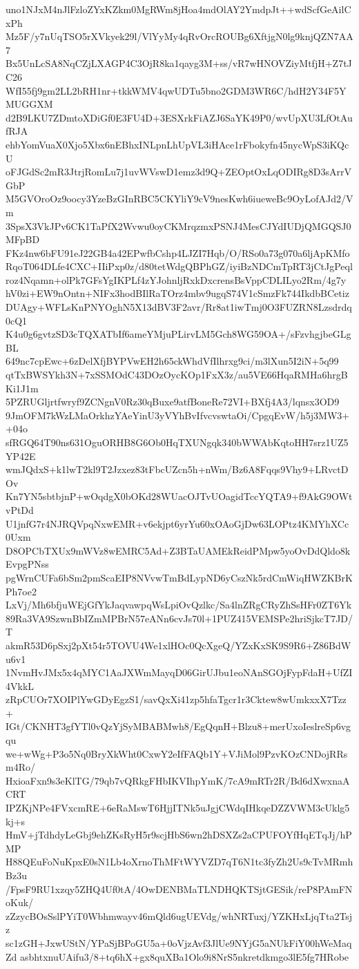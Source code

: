 uno1NJxM4nJlFzloZYxKZkm0MgRWm8jHoa4mdOlAY2YmdpJt++wdScfGeAilCxPh
Mz5F/y7nUqTSO5rXVkyek29l/VlYyMy4qRvOrcROUBg6XftjgN0lg9knjQZN7AA7
Bx5UnLcSA8NqCZjLXAGP4C3OjR8ka1qayg3M+ss/vR7wHNOVZiyMtfjH+Z7tJC26
WfI55fj9gm2LL2bRH1nr+tkkWMV4qwUDTu5bno2GDM3WR6C/hdH2Y34F5YMUGGXM
d2B9LKU7ZDmtoXDiGf0E3FU4D+3ESXrkFiAZJ6SaYK49P0/wvUpXU3LfOtAufRJA
ehbYomVuaX0Xjo5Xbx6nEBhxINLpnLhUpVL3iHAce1rFbokyfn45nycWpS3iKQcU
oFJGdSc2mR3JtrjRomLu7j1uvWVswD1emz3d9Q+ZEOptOxLqODIRg8D3sArrVGbP
M5GVOroOz9oocy3YzeBzGInRBC5CKYliY9cV9nesKwh6iueweBc9OyLofAJd2/Vm
3SpsX3VkJPv6CK1TaPfX2Wvwu0oyCKMrqzmxPSNJ4MesCJYdIUDjQMGQSJ0MFpBD
FKz4nw6bFU91eJ22GB4a42EPwfbCshp4LJZI7Hqb/O/RSo0a73g070a6ljApKMfo
RqoT064DLfe4CXC+IIiPxp0z/d80tetWdgQBPhGZ/iyiBzNDCmTpRT3jCtJgPeql
roz4Nqamn+olPk7GFsYgIKPLf4zYJohnljRxkDxcrensBsVppCDLILyo2Rm/4g7y
hV0zi+EW9nOntn+NIFx3hodBIlRaTOrz4mbv9ugqS74V1cSmzFk744IkdbBCetiz
DUAgy+WFLsKnPNYOghN5X13dBV3F2avr/Rr8at1iwTmj0O3FUZRN8Lzsdrdq0cQ1
K4u0g6gvtzSD3cTQXATbIf6ameYMjuPLirvLM5Gch8WG59OA+/sFzvhgjbeGLgBL
649nc7cpEwc+6zDelXfjBYPVwEH2h65ckWhdVfIlhrxg9ci/m3lXun5I2iN+5q99
qtTxBWSYkh3N+7xSSMOdC43DOzOycKOp1FxX3z/au5VE66HqaRMHa6hrgBKi1J1m
5PZRUGljrtfwryf9ZCNgnV0Rz30qBuxe9atfBoneRe72VI+BXfj4A3/lqnsx3OD9
9JmOFM7kWzLMaOrkhzYAeYinU3yVYhBvIfvcvswtaOi/CpgqEvW/h5j3MW3++04o
sfRGQ64T90ns631OguORHB8G6Ob0HqTXUNgqk340bWWAbKqtoHH7srz1UZ5YP42E
wmJQdxS+k1lwT2kl9T2Jzxez83tFbcUZcn5h+nWm/Bz6A8Fqqs9Vhy9+LRvctDOv
Kn7YN5sbtbjnP+wOqdgX0bOKd28WUacOJTvUOagidTccYQTA9+f9AkG9OWtvPtDd
U1jnfG7r4NJRQVpqNxwEMR+v6ekjpt6yrYu60xOAoGjDw63LOPtz4KMYhXCc0Uxm
D8OPCbTXUx9mWVz8wEMRC5Ad+Z3BTaUAMEkReidPMpw5yoOvDdQldo8kEvpgPNss
pgWrnCUFa6bSm2pmScaEIP8NVvwTmBdLypND6yCszNk5rdCmWiqHWZKBrKPh7oe2
LxVj/Mh6bfjuWEjGfYkJaqvawpqWsLpiOvQzlkc/Sa4lnZRgCRyZhSsHFr0ZT6Yk
89Ra3VA9SzwnBbIZmMPBrN57eANn6cvJs70l+1PUZ415VEMSPe2hriSjkcT7JD/T
akmR53D6pSxj2pXt54r5TOVU4We1xlHOc0QcXgeQ/YZxKxSK9S9R6+Z86BdWu6v1
1NvmHvJMx5x4qMYC1AaJXWmMayqD06GirUJbu1eoNAnSGOjFypFdaH+UfZI4VkkL
zRpCUOr7XOIPlYwGDyEgzS1/savQxXi41zp5hfaTgcr1r3Cktew8wUmkxxX7Tzz+
IGt/CKNHT3gfYTl0vQzYjSyMBABMwh8/EgQqnH+Blzu8+merUxoIeslreSp6vgqu
we+wWg+P3o5Nq0BryXkWht0CxwY2eIfFAQb1Y+VJiMol9PzvKOzCNDojRRsm4Ro/
HxioaFxn9s3eKlTG/79qb7vQRkgFHbIKVIhpYmK/7cA9mRTr2R/Bd6dXwxnaACRT
IPZKjNPe4FVxcmRE+6eRaMswT6HjjITNk5uJgjCWdqIHkqeDZZVWM3cUklg5kj+s
HmV+jTdhdyLeGbj9ehZKsRyH5r9scjHbS6wn2hDSXZs2aCPUFOYfHqETqJj/hPMP
H88QEuFoNuKpxE0sN1Lb4oXrnoThMFtWYVZD7qT6N1tc3fyZh2Us9cTvMRmhBz3u
/FpsF9RU1xzqy5ZHQ4Uf0tA/4OwDENBMaTLNDHQKTSjtGESik/reP8PAmFNoKuk/
zZzycBOsSslPYiT0Wbhmwayv46mQld6ugUEVdg/whNRTuxj/YZKHxLjqTta2Tsjz
sc1zGH+JxwUStN/YPaSjBPoGU5a+0oVjzAvf3JlUe9NYjG5aNUkFiY00hWeMaqZd
asbhtxnuUAifu3/8+tq6hX+gx8quXBa1Olo9i8NrS5nkretdkmgo3lE5fg7HRobe
